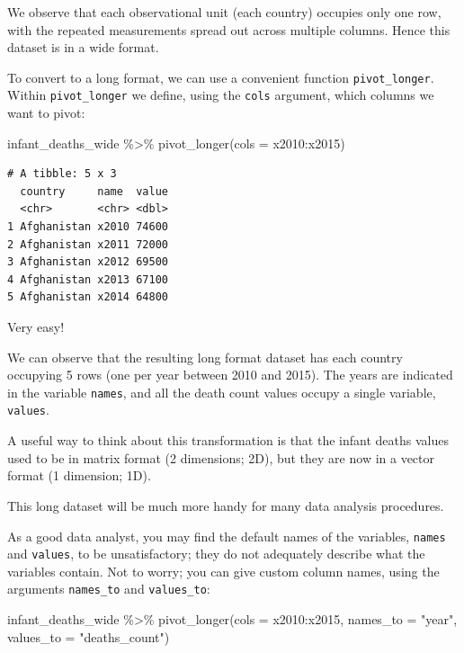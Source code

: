 \documentclass[
  letterpaper,
  DIV=11,
  numbers=noendperiod]{scrreprt}
\newenvironment{Shaded}{\begin{snugshade}}{\end{snugshade}}
\newcommand{\AttributeTok}[1]{\textcolor[rgb]{0.40,0.45,0.13}{#1}}
\newcommand{\FunctionTok}[1]{\textcolor[rgb]{0.28,0.35,0.67}{#1}}
\newcommand{\NormalTok}[1]{\textcolor[rgb]{0.00,0.23,0.31}{#1}}
\newcommand{\SpecialCharTok}[1]{\textcolor[rgb]{0.37,0.37,0.37}{#1}}
\newcommand{\StringTok}[1]{\textcolor[rgb]{0.13,0.47,0.30}{#1}}
\begin{document}
We observe that each observational unit (each country) occupies only one
row, with the repeated measurements spread out across multiple columns.
Hence this dataset is in a wide format.

To convert to a long format, we can use a convenient function
\texttt{pivot\_longer}. Within \texttt{pivot\_longer} we define, using
the \texttt{cols} argument, which columns we want to pivot:

\begin{Shaded}
\begin{Highlighting}[]
\NormalTok{infant\_deaths\_wide }\SpecialCharTok{\%\textgreater{}\%} 
  \FunctionTok{pivot\_longer}\NormalTok{(}\AttributeTok{cols =}\NormalTok{ x2010}\SpecialCharTok{:}\NormalTok{x2015)}
\end{Highlighting}
\end{Shaded}

\begin{verbatim}
# A tibble: 5 x 3
  country     name  value
  <chr>       <chr> <dbl>
1 Afghanistan x2010 74600
2 Afghanistan x2011 72000
3 Afghanistan x2012 69500
4 Afghanistan x2013 67100
5 Afghanistan x2014 64800
\end{verbatim}

Very easy!

We can observe that the resulting long format dataset has each country
occupying 5 rows (one per year between 2010 and 2015). The years are
indicated in the variable \texttt{names}, and all the death count values
occupy a single variable, \texttt{values}.

A useful way to think about this transformation is that the infant
deaths values used to be in matrix format (2 dimensions; 2D), but they
are now in a vector format (1 dimension; 1D).

This long dataset will be much more handy for many data analysis
procedures.

As a good data analyst, you may find the default names of the variables,
\texttt{names} and \texttt{values}, to be unsatisfactory; they do not
adequately describe what the variables contain. Not to worry; you can
give custom column names, using the arguments \texttt{names\_to} and
\texttt{values\_to}:

\begin{Shaded}
\begin{Highlighting}[]
\NormalTok{infant\_deaths\_wide }\SpecialCharTok{\%\textgreater{}\%} 
  \FunctionTok{pivot\_longer}\NormalTok{(}\AttributeTok{cols =}\NormalTok{ x2010}\SpecialCharTok{:}\NormalTok{x2015,}
               \AttributeTok{names\_to =} \StringTok{"year"}\NormalTok{, }
               \AttributeTok{values\_to =} \StringTok{"deaths\_count"}\NormalTok{)}
\end{Highlighting}
\end{Shaded}
\end{document}
